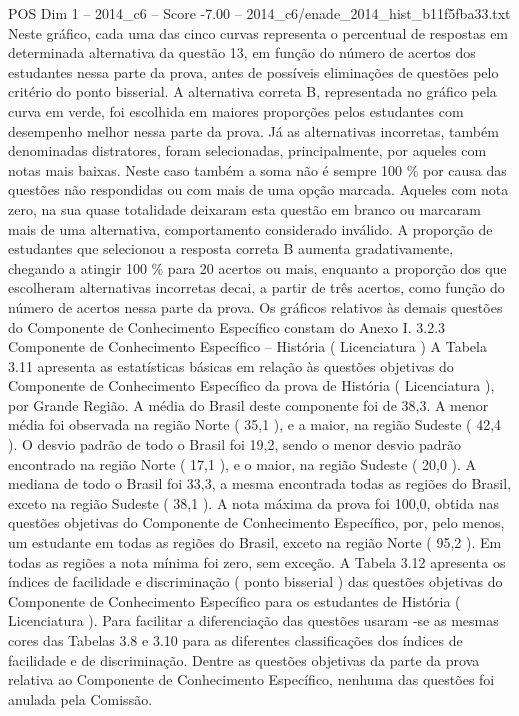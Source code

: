 \begin{textsample}{POS Dim 1 – 2014\_c6 – Score -7.00 – 2014\_c6/enade\_2014\_hist\_b11f5fba33.txt}
Neste gráfico, cada uma das cinco curvas representa o percentual de respostas em determinada alternativa da questão 13, em função do número de acertos dos estudantes nessa parte da prova, antes de possíveis eliminações de questões pelo critério do ponto bisserial.
A alternativa correta B, representada no gráfico pela curva em verde, foi escolhida em maiores proporções pelos estudantes com desempenho melhor nessa parte da prova.
Já as alternativas incorretas, também denominadas distratores, foram selecionadas, principalmente, por aqueles com notas mais baixas.
Neste caso também a soma não é sempre 100 \% por causa das questões não respondidas ou com mais de uma opção marcada.
Aqueles com nota zero, na sua quase totalidade deixaram esta questão em branco ou marcaram mais de uma alternativa, comportamento considerado inválido.
A proporção de estudantes que selecionou a resposta correta B aumenta gradativamente, chegando a atingir 100 \% para 20 acertos ou mais, enquanto a proporção dos que escolheram alternativas incorretas decai, a partir de três acertos, como função do número de acertos nessa parte da prova.
Os gráficos relativos às demais questões do Componente de Conhecimento Específico constam do Anexo I. 3.2.3 Componente de Conhecimento Específico – História ( Licenciatura ) A Tabela 3.11 apresenta as estatísticas básicas em relação às questões objetivas do Componente de Conhecimento Específico da prova de História ( Licenciatura ), por Grande Região.
A média do Brasil deste componente foi de 38,3.
A menor média foi observada na região Norte ( 35,1 ), e a maior, na região Sudeste ( 42,4 ).
O desvio padrão de todo o Brasil foi 19,2, sendo o menor desvio padrão encontrado na região Norte ( 17,1 ), e o maior, na região Sudeste ( 20,0 ).
A mediana de todo o Brasil foi 33,3, a mesma encontrada todas as regiões do Brasil, exceto na região Sudeste ( 38,1 ).
A nota máxima da prova foi 100,0, obtida nas questões objetivas do Componente de Conhecimento Específico, por, pelo menos, um estudante em todas as regiões do Brasil, exceto na região Norte ( 95,2 ).
Em todas as regiões a nota mínima foi zero, sem exceção.
A Tabela 3.12 apresenta os índices de facilidade e discriminação ( ponto bisserial ) das questões objetivas do Componente de Conhecimento Específico para os estudantes de História ( Licenciatura ).
Para facilitar a diferenciação das questões usaram -se as mesmas cores das Tabelas 3.8 e 3.10 para as diferentes classificações dos índices de facilidade e de discriminação.
Dentre as questões objetivas da parte da prova relativa ao Componente de Conhecimento Específico, nenhuma das questões foi anulada pela Comissão.

\end{textsample}
